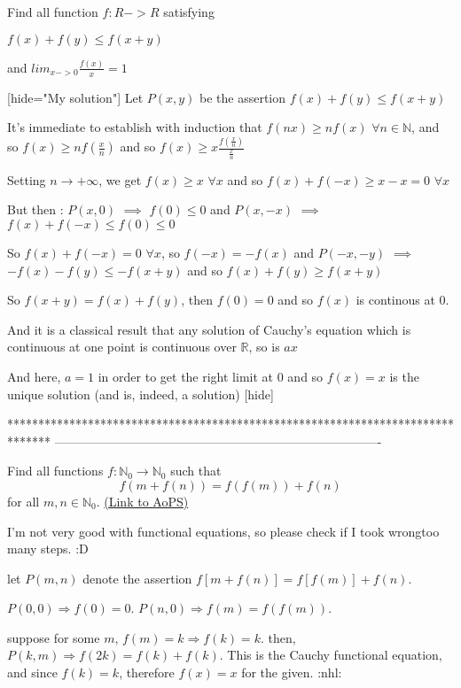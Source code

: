 \begin{solution}
	\begin{tcolorbox}Find all function $ f : R - > R$ satisfying 

$ f(x) + f(y) \leq f(x + y)$

and $ lim_{x - > 0}\frac {f(x)}{x} = 1$\end{tcolorbox}

[hide="My solution"]
Let $ P(x,y)$ be the assertion $ f(x)+f(y)\leq f(x+y)$

It's immediate to establish with induction that $ f(nx)\geq nf(x)$ $ \forall n\in\mathbb N$, and so $ f(x)\geq nf(\frac xn)$ and so $ f(x)\geq x\frac{f(\frac xn)}{\frac xn}$

Setting $ n\to +\infty$, we get  $ f(x)\geq x$ $ \forall x$ and so $ f(x)+f(-x)\geq x-x=0$ $ \forall x$

But then : $ P(x,0)$ $ \implies$ $ f(0)\leq 0$ and $ P(x,-x)$ $ \implies$ $ f(x)+f(-x)\leq f(0)\leq 0$

So $ f(x)+f(-x)=0$ $ \forall x$, so $ f(-x)=-f(x)$ and $ P(-x,-y)$ $ \implies$ $ -f(x)-f(y)\leq -f(x+y)$ and so $ f(x)+f(y)\geq f(x+y)$

So $ f(x+y)=f(x)+f(y)$, then $ f(0)=0$ and so $ f(x)$ is continous at $ 0$.

And it is a classical result that any solution of Cauchy's equation which is continuous at one point is continuous over $ \mathbb R$, so is $ ax$

And here, $ a=1$ in order to get the right limit at $ 0$ and so $ \boxed{f(x)=x}$ is the unique solution (and is, indeed, a solution)
[\/hide]
\end{solution}
*******************************************************************************
-------------------------------------------------------------------------------

\begin{problem}
	Find all functions $ f: \mathbb{N}_{0}\rightarrow\mathbb{N}_{0}$ such that
\[f(m + f(n)) = f(f(m)) + f(n)\]
for all $m,n\in\mathbb{N}_{0}$.
	\flushright \href{https://artofproblemsolving.com/community/c6h297535}{(Link to AoPS)}
\end{problem}



\begin{solution}
	I'm not very good with functional equations, so please check if I took wrong\/too many steps.  :D 

let $ P(m,n)$ denote the assertion $ f[m + f(n)] = f[f(m)] + f(n).$

$ P(0,0) \Rightarrow f(0) = 0.$
$ P(n,0) \Rightarrow f(m) = f(f(m)).$

suppose for some $ m$, $ f(m) = k \Rightarrow f(k) = k.$
then, $ P(k,m) \Rightarrow f(2k) = f(k) + f(k).$
This is the Cauchy functional equation, and since $ f(k) = k$, therefore $ f(x) = x$ for the given. :nhl:
\end{solution}



